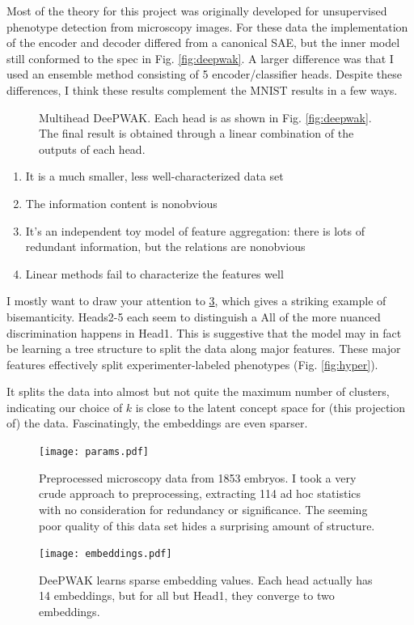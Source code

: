 Most of the theory for this project was originally developed for unsupervised phenotype detection
from microscopy images.
For these data the implementation of the encoder and decoder differed from a canonical SAE,
but the inner model still conformed to the spec in Fig. \ref{fig:deepwak}.
A larger difference was that I used an ensemble method consisting of 5 encoder/classifier heads.
Despite these differences, I think these results complement the MNIST results in a few ways.

\begin{figure}
    \centering
    
    \caption{Multihead DeePWAK. Each head is as shown in Fig. \ref{fig:deepwak}.
    The final result is obtained through a linear combination of the outputs 
    of each head.}
    \label{fig:block}
\end{figure}

\begin{enumerate}
    \item It is a much smaller, less well-characterized data set
    \item The information content is nonobvious
    \item It's an independent toy model of feature aggregation: there is lots of redundant information,
    but the relations are nonobvious
    \item Linear methods fail to characterize the features well
\end{enumerate}

I mostly want to draw your attention to \ref{fig:blockE}, which gives a striking example of bisemanticity.
\textsf{Heads2-5} each seem to distinguish a All of the more nuanced discrimination happens in \textsf{Head1}.
This is suggestive that the model may in fact be learning a tree structure to split the data along major features. These major features effectively split experimenter-labeled phenotypes (Fig. \ref{fig:hyper}). 

It splits the data into almost but not quite the maximum number of clusters, indicating our choice of $k$ is close to the latent concept space for (this projection of) the data.
Fascinatingly, the embeddings are even sparser.

\begin{figure}
  \texttt{[image: params.pdf]}
    \caption{Preprocessed microscopy data from 1853 embryos.
    I took a very crude approach to preprocessing, 
    extracting 114 ad hoc statistics with no consideration for redundancy or significance.
    The seeming poor quality of this data set hides a surprising amount of structure.
    }
    \label{fig:params}
\end{figure}

\begin{figure}
  \texttt{[image: embeddings.pdf]}
    \caption{DeePWAK learns sparse embedding values. 
    Each head actually has 14 embeddings, but for all but \textsf{Head1}, 
    they converge to two embeddings. 
    }
    \label{fig:blockE}
\end{figure}
